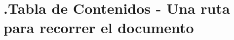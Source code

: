 \clearpage
{}
\section*{\thesection.\quad Tabla de Contenidos - Una ruta para recorrer el documento}\label{sec:spmp-3}
\makeatletter{}\makeatother
